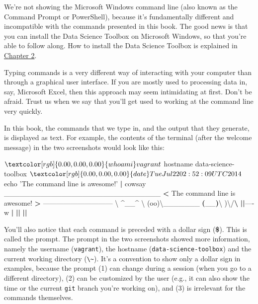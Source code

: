 \documentclass[
]{book}
\newenvironment{Shaded}{\begin{snugshade}}{\end{snugshade}}
\newcommand{\BuiltInTok}[1]{#1}
\newcommand{\ExtensionTok}[1]{#1}
\newcommand{\FunctionTok}[1]{\textcolor[rgb]{0.00,0.00,0.00}{#1}}
\newcommand{\KeywordTok}[1]{\textcolor[rgb]{0.13,0.29,0.53}{\textbf{#1}}}
\newcommand{\NormalTok}[1]{#1}
\newcommand{\OperatorTok}[1]{\textcolor[rgb]{0.81,0.36,0.00}{\textbf{#1}}}
\newcommand{\StringTok}[1]{\textcolor[rgb]{0.31,0.60,0.02}{#1}}
\theoremstyle{definition}
\theoremstyle{definition}
\theoremstyle{definition}
\theoremstyle{remark}
\begin{document}
\begin{rmdnote}
We're not showing the Microsoft Windows command line (also known as the Command Prompt or PowerShell), because it's fundamentally different and incompatible with the commands presented in this book. The good news is that you can install the Data Science Toolbox on Microsoft Windows, so that you're able to follow along. How to install the Data Science Toolbox is explained in \protect\hyperlink{chapter-2-getting-started}{Chapter 2}.
\end{rmdnote}

Typing commands is a very different way of interacting with your computer than through a graphical user interface. If you are mostly used to processing data in, say, Microsoft Excel, then this approach may seem intimidating at first. Don't be afraid. Trust us when we say that you'll get used to working at the command line very quickly.

In this book, the commands that we type in, and the output that they generate, is displayed as text. For example, the contents of the terminal (after the welcome message) in the two screenshots would look like this:

\begin{Shaded}
\begin{Highlighting}[]
\NormalTok{$ }\FunctionTok{whoami}
\ExtensionTok{vagrant}
\NormalTok{$ }\FunctionTok{hostname}
\ExtensionTok{data-science-toolbox}
\NormalTok{$ }\FunctionTok{date}
\ExtensionTok{Tue}\NormalTok{ Jul 22 02:52:09 UTC 2014}
\NormalTok{$ }\BuiltInTok{echo} \StringTok{'The command line is awesome!'} \KeywordTok{|} \ExtensionTok{cowsay}
 \ExtensionTok{______________________________}
\OperatorTok{<} \ExtensionTok{The}\NormalTok{ command line is awesome! }\OperatorTok{>}
 \ExtensionTok{------------------------------}
        \ExtensionTok{\textbackslash{} }\NormalTok{  ^__^}
         \ExtensionTok{\textbackslash{} }\NormalTok{ (oo)\textbackslash{}}\ExtensionTok{_______}
            \KeywordTok{(}\ExtensionTok{__}\KeywordTok{)}\ExtensionTok{\textbackslash{} }\NormalTok{      )\textbackslash{}/}\KeywordTok{\textbackslash{}}
                \KeywordTok{||}\ExtensionTok{----w} \KeywordTok{|}
                \KeywordTok{||}     \KeywordTok{||}
\end{Highlighting}
\end{Shaded}

You'll also notice that each command is preceded with a dollar sign (\textbf{\$}). This is called the prompt. The prompt in the two screenshots showed more information, namely the username (\texttt{vagrant}), the hostname (\texttt{data-science-toolbox}) and the current working directory (\texttt{\textbackslash{}\textasciitilde{}}). It's a convention to show only a dollar sign in examples, because the prompt (1) can change during a session (when you go to a different directory), (2) can be customized by the user (e.g., it can also show the time or the current \texttt{git} \citep{git} branch you're working on), and (3) is irrelevant for the commands themselves.
\end{document}
